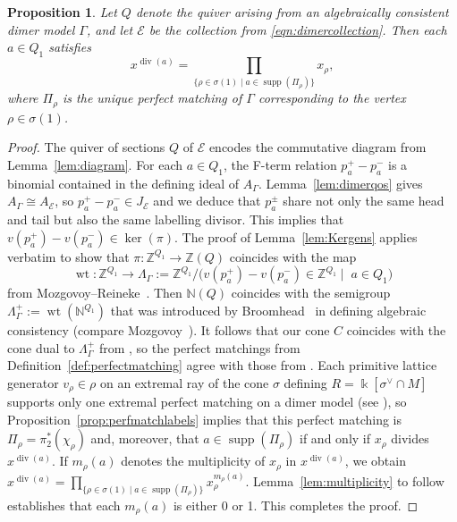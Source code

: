 \documentclass[11pt,a4paper]{amsart}
\numberwithin{equation}{section}
\newtheorem{proposition}[theorem]{Proposition}
\theoremstyle{definition}
\theoremstyle{remark}
\newcommand{\kk}{\ensuremath{\Bbbk}}
\newcommand{\NN}{\ensuremath{\mathbb{N}}}
\newcommand{\ZZ}{\ensuremath{\mathbb{Z}}}
\renewcommand{\div}{\operatorname{div}}
\newcommand{\supp}{\operatorname{supp}}
\newcommand{\wt}{\operatorname{wt}}
\newcommand{\Ker}{\operatorname{ker}}
\begin{document}
  \begin{proposition}
  \label{prop:dimerlabels}
 Let $Q$ denote the quiver arising from an algebraically consistent dimer model $\Gamma$, and let $\mathscr{E}$ be the collection from \eqref{eqn:dimercollection}. Then each $a\in Q_1$ satisfies
 \begin{equation}
 \label{eqn:label}
 x^{\div(a)} =  \prod_{\{\rho\in \sigma(1) \mid a\in \supp(\Pi_\rho)\}} x_\rho,
 \end{equation}
  where $\Pi_\rho$ is the unique perfect matching of $\Gamma$ corresponding to the vertex $\rho\in \sigma(1)$.
\end{proposition}
\begin{proof}
The quiver of sections $Q$ of $\mathscr{E}$ encodes the commutative diagram from Lemma~\ref{lem:diagram}. For each $a\in Q_1$, the F-term relation $p_a^+ -p_a^-$ is a binomial contained in the defining ideal of $A_{\Gamma}$.  Lemma~\ref{lem:dimerqos} gives $A_\Gamma\cong A_\mathscr{E}$, so $p_a^+ -p_a^-\in J_\mathscr{E}$ and we deduce that $p_a^{\pm}$ share not only the same head and tail but also the same labelling divisor. This implies that $v(p_a^+) - v(p_a^-)\in \Ker(\pi)$. The proof of Lemma~\ref{lem:Kergens} applies verbatim to show that  $\pi\colon \ZZ^{Q_1}\to \ZZ(Q)$ coincides with the map 
  \[
 \wt\colon \ZZ^{Q_1}\to \Lambda_\Gamma:= \ZZ^{Q_1}/\big(v(p_a^+) - v(p_a^-)\in \ZZ^{Q_1} \mid \;a\in Q_1\big)
    \]
from Mozgovoy--Reineke~\cite[\S 3]{MozgovoyReineke}.  Then $\NN(Q)$ coincides with the semigroup $\Lambda_\Gamma^+:=\wt(\NN^{Q_1})$ that was introduced by Broomhead~\cite[Example 5.5]{Broomhead}  in defining algebraic consistency (compare Mozgovoy~\cite[Remark~3.8]{Mozgovoy}). It follows that our cone $C$ coincides with the cone dual to $\Lambda_\Gamma^+$ from \cite{Broomhead}, so the perfect matchings from Definition~\ref{def:perfectmatching} agree with those from \cite[Lemma~2.11]{Broomhead}.  Each primitive lattice generator $v_\rho\in \rho$ on an extremal ray of the cone $\sigma$ defining $R=\kk[\sigma^\vee\cap M]$ supports only one extremal perfect matching on a dimer model  (see \cite[Proposition~6.5]{IshiiUeda2}), so Proposition~\ref{prop:perfmatchlabels} implies that this perfect matching is $\Pi_\rho=\pi_2^*(\chi_\rho)$ and, moreover, that $a\in \supp(\Pi_\rho)$ if and only if $x_\rho$ divides $x^{\div(a)}$. If $m_\rho(a)$ denotes the multiplicity of $x_\rho$ in $x^{\div(a)}$, we obtain $x^{\div(a)} =  \prod_{\{\rho\in \sigma(1) \mid a\in \supp(\Pi_\rho)\}} x_\rho^{m_\rho(a)}$. Lemma~\ref{lem:multiplicity} to follow establishes that each $m_\rho(a)$ is either 0 or 1. This completes the proof.
\end{proof}
\end{document}
